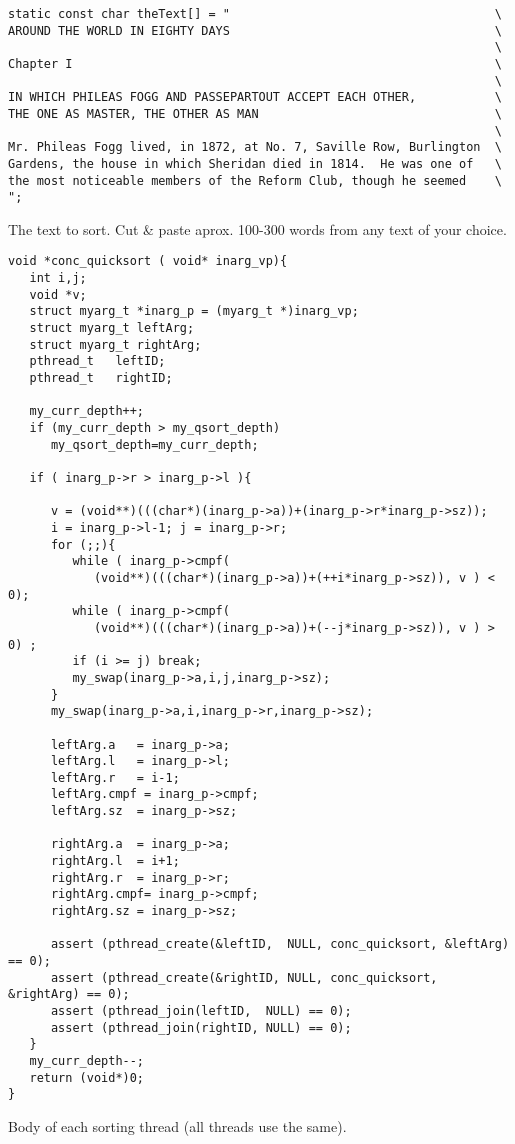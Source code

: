 \begin{table}[!hbp]
\begin{verbatim}
static const char theText[] = "                                     \
AROUND THE WORLD IN EIGHTY DAYS                                     \
                                                                    \
Chapter I                                                           \
                                                                    \
IN WHICH PHILEAS FOGG AND PASSEPARTOUT ACCEPT EACH OTHER,           \
THE ONE AS MASTER, THE OTHER AS MAN                                 \
                                                                    \
Mr. Phileas Fogg lived, in 1872, at No. 7, Saville Row, Burlington  \
Gardens, the house in which Sheridan died in 1814.  He was one of   \
the most noticeable members of the Reform Club, though he seemed    \
";
\end{verbatim}
\caption{The text to sort. Cut \& paste aprox. 100-300 words from any text of your choice.\label{ccsort_text}}
\end{table}

\begin{table}[!hbp]
\begin{verbatim}
void *conc_quicksort ( void* inarg_vp){
   int i,j;
   void *v;
   struct myarg_t *inarg_p = (myarg_t *)inarg_vp;
   struct myarg_t leftArg;
   struct myarg_t rightArg;
   pthread_t   leftID;
   pthread_t   rightID;

   my_curr_depth++;
   if (my_curr_depth > my_qsort_depth)
      my_qsort_depth=my_curr_depth;

   if ( inarg_p->r > inarg_p->l ){

      v = (void**)(((char*)(inarg_p->a))+(inarg_p->r*inarg_p->sz));
      i = inarg_p->l-1; j = inarg_p->r;
      for (;;){
         while ( inarg_p->cmpf(
            (void**)(((char*)(inarg_p->a))+(++i*inarg_p->sz)), v ) < 0);
         while ( inarg_p->cmpf(
            (void**)(((char*)(inarg_p->a))+(--j*inarg_p->sz)), v ) > 0) ;
         if (i >= j) break;
         my_swap(inarg_p->a,i,j,inarg_p->sz);
      }
      my_swap(inarg_p->a,i,inarg_p->r,inarg_p->sz);

      leftArg.a   = inarg_p->a;
      leftArg.l   = inarg_p->l;
      leftArg.r   = i-1;
      leftArg.cmpf = inarg_p->cmpf;
      leftArg.sz  = inarg_p->sz;

      rightArg.a  = inarg_p->a;
      rightArg.l  = i+1;
      rightArg.r  = inarg_p->r;
      rightArg.cmpf= inarg_p->cmpf;
      rightArg.sz = inarg_p->sz;

      assert (pthread_create(&leftID,  NULL, conc_quicksort, &leftArg)  == 0);
      assert (pthread_create(&rightID, NULL, conc_quicksort, &rightArg) == 0);
      assert (pthread_join(leftID,  NULL) == 0);     
      assert (pthread_join(rightID, NULL) == 0);     
   }
   my_curr_depth--;
   return (void*)0;
}
\end{verbatim}
\caption{Body of each sorting thread (all threads use the same).\label{ccsort_thread}}
\end{table}

